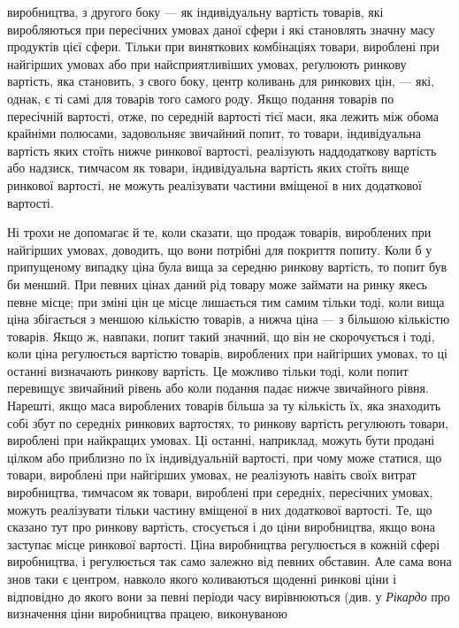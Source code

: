 \parcont{}  %
виробництва, з другого боку — як індивідуальну вартість товарів,
які виробляються при пересічних умовах даної сфери і які становлять
значну масу продуктів цієї сфери. Тільки при виняткових
комбінаціях товари, вироблені при найгірших умовах або
при найсприятливіших умовах, реґулюють ринкову вартість, яка становить,
з свого боку, центр коливань для ринкових цін, —
які, однак, є ті самі для товарів того самого роду. Якщо подання
товарів по пересічній вартості, отже, по середній вартості
тієї маси, яка лежить між обома крайніми полюсами,
задовольняє звичайний попит, то товари, індивідуальна вартість
яких стоїть нижче ринкової вартості, реалізують наддодаткову
вартість або надзиск, тимчасом як товари, індивідуальна вартість
яких стоїть вище ринкової вартості, не можуть реалізувати
частини вміщеної в них додаткової вартості.

Ні трохи не допомагає й те, коли сказати, що продаж товарів,
вироблених при найгірших умовах, доводить, що вони
потрібні для покриття попиту.
Коли б у припущеному випадку
ціна була вища за середню ринкову вартість, то попит був би
менший.
При певних цінах даний рід товару може займати
на ринку якесь певне місце; при зміні цін це місце лишається
тим самим тільки тоді, коли вища ціна збігається з меншою
кількістю товарів, а нижча ціна — з більшою кількістю товарів.
Якщо ж, навпаки, попит такий значний, що він не скорочується
і тоді, коли ціна регулюється вартістю товарів, вироблених при
найгірших умовах, то ці останні визначають ринкову вартість.
Це можливо тільки тоді, коли попит перевищує звичайний рівень
або коли подання падає нижче звичайного рівня. Нарешті,
якщо маса вироблених товарів більша за ту кількість їх, яка
знаходить собі збут по середніх ринкових вартостях, то ринкову
вартість регулюють товари, вироблені при найкращих
умовах. Ці останні, наприклад, можуть бути продані цілком або
приблизно по їх індивідуальній вартості, при чому може статися,
що товари, вироблені при найгірших умовах, не реалізують навіть
своїх витрат виробництва, тимчасом як товари, вироблені
при середніх, пересічних умовах, можуть реалізувати тільки частину
вміщеної в них додаткової вартості. Те, що сказано тут
про ринкову вартість, стосується і до ціни виробництва, якщо
вона заступає місце ринкової вартості. Ціна виробництва регулюється
в кожній сфері виробництва, і регулюється так само
залежно від певних обставин. Але сама вона знов таки є центром,
навколо якого коливаються щоденні ринкові ціни і відповідно
до якого вони за певні періоди часу вирівнюються (див.
у \emph{Рікардо} про визначення ціни виробництва працею, виконуваною
\parbreak{}  %

